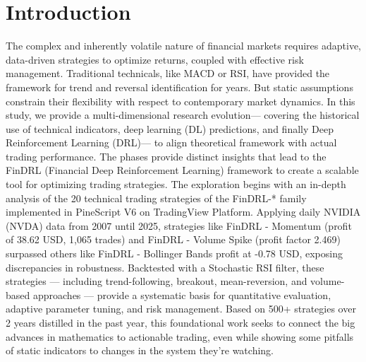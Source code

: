 \chapter{Introduction}
The complex and inherently volatile nature of financial markets requires adaptive, data-driven strategies to optimize returns, coupled with effective risk management. Traditional technicals, like MACD or RSI, have provided the framework for trend and reversal identification for years. But static assumptions constrain their flexibility with respect to contemporary market dynamics. In this study, we provide a multi-dimensional research evolution— covering the historical use of technical indicators, deep learning (DL) predictions, and finally Deep Reinforcement Learning (DRL)— to align theoretical framework with actual trading performance. The phases provide distinct insights that lead to the FinDRL (Financial Deep Reinforcement Learning) framework to create a scalable tool for optimizing trading strategies. The exploration begins with an in-depth analysis of the 20 technical trading strategies of the FinDRL-* family implemented in PineScript V6 on TradingView Platform. Applying daily NVIDIA (NVDA) data from 2007 until 2025, strategies like FinDRL - Momentum (profit of 38.62 USD, 1,065 trades) and FinDRL - Volume Spike (profit factor 2.469) surpassed others like FinDRL - Bollinger Bands profit at -0.78 USD, exposing discrepancies in robustness. Backtested with a Stochastic RSI filter, these strategies — including trend-following, breakout, mean-reversion, and volume-based approaches — provide a systematic basis for quantitative evaluation, adaptive parameter tuning, and risk management. Based on 500+ strategies over 2 years distilled in the past year, this foundational work seeks to connect the big advances in mathematics to actionable trading, even while showing some pitfalls of static indicators to changes in the system they’re watching.

